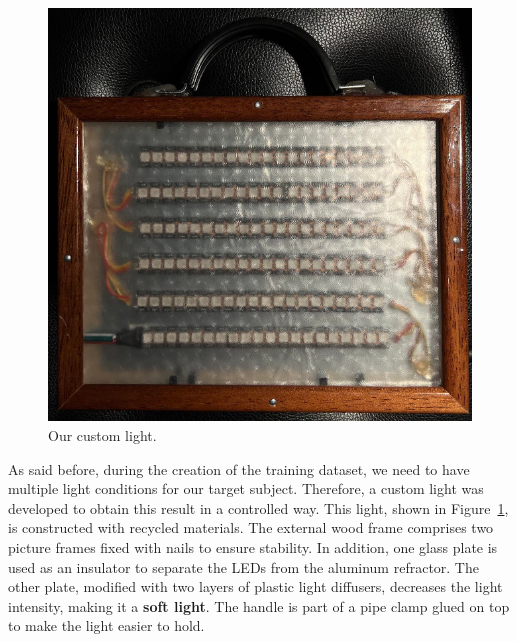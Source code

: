 \documentclass[sn-mathphys,Numbered]{sn-jnl}
\theoremstyle{thmstyleone}%
\theoremstyle{thmstyletwo}%
\theoremstyle{thmstylethree}%
\begin{document}
\begin{figure}[t]
	\centering
	\includegraphics[scale=0.25, keepaspectratio]{img/project_img/light.jpeg}
	\caption{Our custom light.}
	\label{fig:light}
\end{figure}

As said before, during the creation of the training dataset, we need to have multiple 
light conditions for our target subject. 
Therefore, a custom light was developed to obtain this result in a controlled way. This light, shown in Figure~\ref{fig:light}, is constructed with recycled materials. The external wood frame comprises two picture frames fixed with nails to ensure stability.  In addition, one glass plate is used as an insulator to separate the LEDs from the aluminum refractor. The other plate, modified with two layers of plastic light diffusers,  decreases the light intensity, making it a \textbf{soft light}.
The handle is part of a pipe clamp glued on top to make the light easier to hold.
\end{document}
